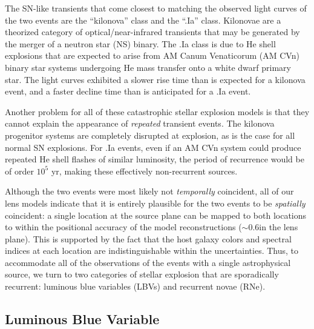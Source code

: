 \begin{multicols}{2}
The SN-like transients that come closest to matching the observed
light curves of the two \spock events are the ``kilonova'' class and
the ``.Ia'' class.  Kilonovae are a theorized category of
optical/near-infrared transients that may be generated by the merger
of a neutron star (NS) binary\cite{Li:1998,Kulkarni:2005}.  The .Ia
class is due to He shell explosions that are expected to arise from AM
Canum Venaticorum (AM CVn) binary star systems undergoing He mass
transfer onto a white dwarf primary star\cite{Warner:1995,
  Nelemans:2005,Bildsten:2007}.  The \spock light curves exhibited a
slower rise time than is expected for a kilonova
event\cite{Metzger:2010,Barnes:2013,Kasen:2015}, and a faster decline
time than is anticipated for a .Ia event\cite{Shen:2010}.

Another problem for all of these catastrophic stellar explosion models
is that they cannot explain the appearance of {\it repeated} transient
events.  The kilonova progenitor systems are completely disrupted at
explosion, as is the case for all normal SN explosions.  For .Ia
events, even if an AM CVn system could produce repeated He shell
flashes of similar luminosity, the period of recurrence would be of
order $10^5$ yr, making these effectively non-recurrent sources.

Although the two events were most likely not {\it temporally}
coincident, all of our lens models indicate that it is entirely
plausible for the two \spock events to be {\it spatially}
coincident: a single location at the source plane can be
mapped to both \spock locations to within the positional accuracy of
the model reconstructions ($\sim$0.6\arcsec in the lens plane). This is
supported by the fact that the host galaxy colors and spectral indices
at each \spock location are indistinguishable within the
uncertainties.  Thus, to accommodate all of the observations of the
\spock events with a single astrophysical source, we turn to two
categories of stellar explosion that are sporadically recurrent:
luminous blue variables (LBVs) and recurrent novae (RNe).

\subsection{Luminous Blue Variable}


\end{multicols}
